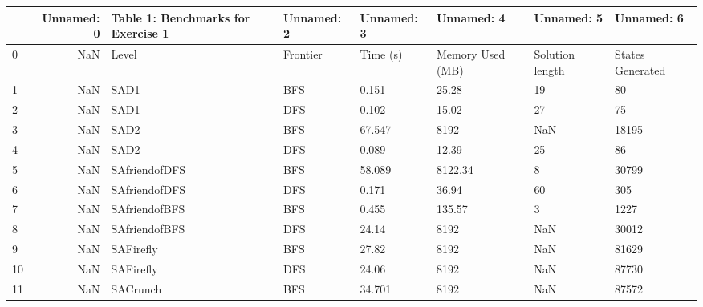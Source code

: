 \begin{tabular}{lrllllll}
\toprule
{} &  Unnamed: 0 &                 Table 1: Benchmarks for Exercise 1 & Unnamed: 2 & Unnamed: 3 &        Unnamed: 4 &       Unnamed: 5 &        Unnamed: 6 \\
\midrule
0  &         NaN &                                              Level &   Frontier &   Time (s) &  Memory Used (MB) &  Solution length &  States Generated \\
1  &         NaN &                                               SAD1 &        BFS &      0.151 &             25.28 &               19 &                80 \\
2  &         NaN &                                               SAD1 &        DFS &      0.102 &             15.02 &               27 &                75 \\
3  &         NaN &                                               SAD2 &        BFS &     67.547 &              8192 &              NaN &             18195 \\
4  &         NaN &                                               SAD2 &        DFS &      0.089 &             12.39 &               25 &                86 \\
5  &         NaN &                                      SAfriendofDFS &        BFS &     58.089 &           8122.34 &                8 &             30799 \\
6  &         NaN &                                      SAfriendofDFS &        DFS &      0.171 &             36.94 &               60 &               305 \\
7  &         NaN &                                      SAfriendofBFS &        BFS &      0.455 &            135.57 &                3 &              1227 \\
8  &         NaN &                                      SAfriendofBFS &        DFS &      24.14 &              8192 &              NaN &             30012 \\
9  &         NaN &                                          SAFirefly &        BFS &      27.82 &              8192 &              NaN &             81629 \\
10 &         NaN &                                          SAFirefly &        DFS &      24.06 &              8192 &              NaN &             87730 \\
11 &         NaN &                                           SACrunch &        BFS &     34.701 &              8192 &              NaN &             87572 \\

\end{tabular}
